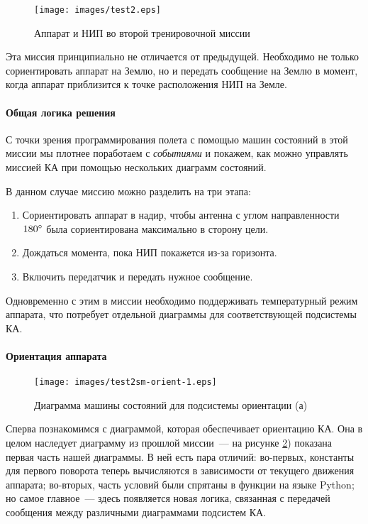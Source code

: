 \documentclass[12pt,a4paper]{article}
\begin{document}
\begin{figure}[tbh]
  \begin{center}
    \texttt{[image: images/test2.eps]}
    \caption{Аппарат и НИП во второй тренировочной миссии}
    \label{Pic:test2}
  \end{center}
\end{figure}

Эта миссия принципиально не отличается от предыдущей. Необходимо не только сориентировать
аппарат на Землю, но и передать сообщение на Землю в момент, когда аппарат приблизится к
точке расположения НИП на Земле.

\paragraph{Общая логика решения} С точки зрения программирования полета с помощью машин
состояний в этой миссии мы плотнее поработаем с \emph{событиями} и покажем, как можно
управлять миссией КА при помощью нескольких диаграмм состояний.

В данном случае миссию можно разделить на три этапа:

\begin{enumerate}
\item Сориентировать аппарат в надир, чтобы антенна с углом направленности
  $180\degree$ была сориентирована максимально в сторону цели.
\item Дождаться момента, пока НИП покажется из-за горизонта.
\item Включить передатчик и передать нужное сообщение.
\end{enumerate}

Одновременно с этим в миссии необходимо поддерживать температурный режим аппарата, что
потребует отдельной диаграммы для соответствующей подсистемы КА.

\paragraph{Ориентация аппарата}

\begin{figure}[tbh]
  \begin{center}
    \texttt{[image: images/test2sm-orient-1.eps]}
    \caption{Диаграмма машины состояний для подсистемы ориентации (а)}
    \label{Pic:Test2SM-Orient-1}
  \end{center}
\end{figure}

Сперва познакомимся с диаграммой, которая обеспечивает ориентацию КА. Она в целом
наследует диаграмму из прошлой миссии~--- на рисунке \ref{Pic:Test2SM-Orient-1}) показана
первая часть нашей диаграммы. В ней есть пара отличий: во-первых, константы для первого
поворота теперь вычисляются в зависимости от текущего движения аппарата; во-вторых, часть
условий были спрятаны в функции на языке Python; но самое главное~--- здесь появляется
новая логика, связанная с передачей сообщения между различными диаграммами подсистем КА.
\end{document}
